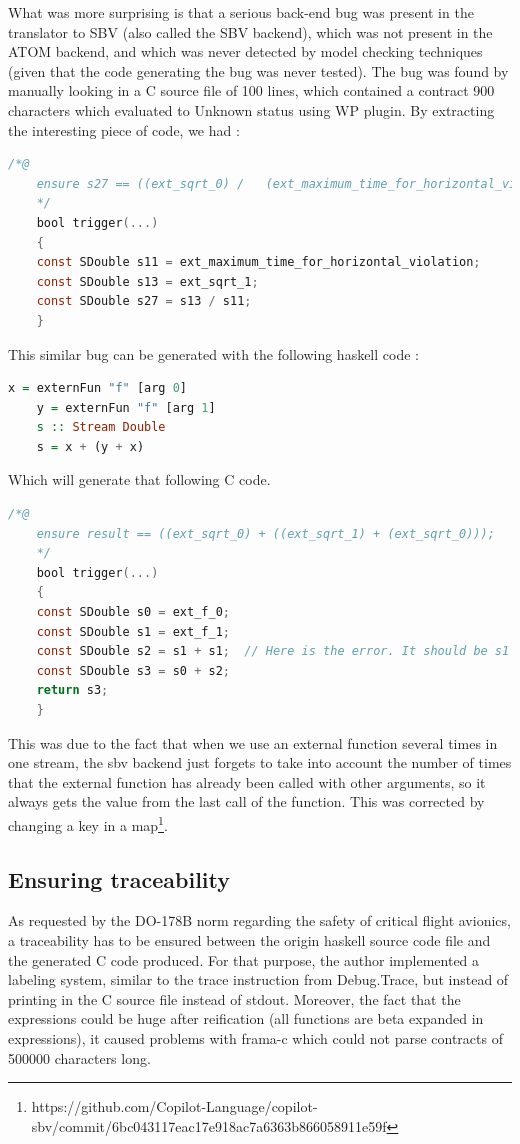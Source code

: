 \documentclass[a4paper,11pt,final]{article}
\begin{document}
	What was more surprising is that a serious back-end bug was present in the translator to SBV (also called the SBV backend), which was not present in the ATOM backend, and which was never detected by model checking techniques (given that the code generating the bug was never tested). The bug was found by manually looking in a C source file of 100 lines, which contained a contract 900 characters which evaluated to Unknown status using WP plugin. By extracting the interesting piece of code, we had :
	\begin{lstlisting}[language=C, keywordstyle=\color{blue}]
	/*@
	ensure s27 == ((ext_sqrt_0) /   (ext_maximum_time_for_horizontal_violation));
	*/
	bool trigger(...)
	{
	const SDouble s11 = ext_maximum_time_for_horizontal_violation;
	const SDouble s13 = ext_sqrt_1;
	const SDouble s27 = s13 / s11;
	}  \end{lstlisting}
	This similar bug can be generated with the following haskell code :
	\begin{lstlisting}[language=Haskell]
	x = externFun "f" [arg 0]
	y = externFun "f" [arg 1]
	s :: Stream Double
	s = x + (y + x)
	\end{lstlisting}
	Which will generate that following C code.
	\begin{lstlisting}[language=C, keywordstyle=\color{blue}]
	/*@
	ensure result == ((ext_sqrt_0) + ((ext_sqrt_1) + (ext_sqrt_0)));
	*/
	bool trigger(...)
	{
	const SDouble s0 = ext_f_0;
	const SDouble s1 = ext_f_1;
	const SDouble s2 = s1 + s1;  // Here is the error. It should be s1 + s0;
	const SDouble s3 = s0 + s2;
	return s3;
	}  \end{lstlisting}
	
	This was due to the fact that when we use an external function several times in one stream, the sbv backend just forgets to take into account the number of times that the external function has already been called with other arguments, so it always gets the value from the last call of the function. This was corrected by changing a key in a map\footnote{https://github.com/Copilot-Language/copilot-sbv/commit/6bc043117eac17e918ac7a6363b866058911e59f}. 
	
	\subsection{Ensuring traceability}
	
	As requested by the DO-178B norm regarding the safety of critical flight avionics, a traceability has to be ensured between the origin haskell source code file and the generated C code produced. For that purpose, the author implemented a labeling system, similar to the trace instruction from Debug.Trace, but instead of printing in the C source file instead of stdout. Moreover, the fact that the expressions could be huge after reification (all functions are beta expanded in expressions), it caused problems with frama-c which could not parse contracts of 500000 characters long. 
	
\end{document}
